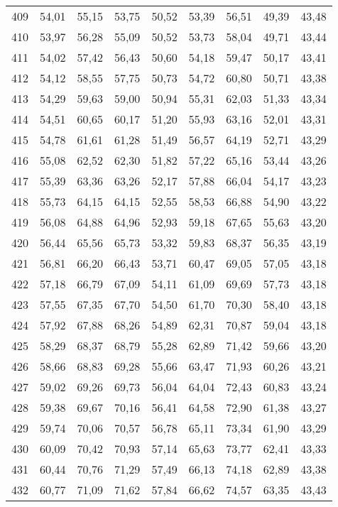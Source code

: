 \begin{longtable}{c c c c c c c c c}
409	& 54,01	& 55,15	& 53,75	& 50,52	& 53,39	& 56,51	& 49,39	& 43,48 \\
410	& 53,97	& 56,28	& 55,09	& 50,52	& 53,73	& 58,04	& 49,71	& 43,44 \\
411	& 54,02	& 57,42	& 56,43	& 50,60	& 54,18	& 59,47	& 50,17	& 43,41 \\
412	& 54,12	& 58,55	& 57,75	& 50,73	& 54,72	& 60,80	& 50,71	& 43,38 \\
413	& 54,29	& 59,63	& 59,00	& 50,94	& 55,31	& 62,03	& 51,33	& 43,34 \\
414	& 54,51	& 60,65	& 60,17	& 51,20	& 55,93	& 63,16	& 52,01	& 43,31 \\
415	& 54,78	& 61,61	& 61,28	& 51,49	& 56,57	& 64,19	& 52,71	& 43,29 \\
416	& 55,08	& 62,52	& 62,30	& 51,82	& 57,22	& 65,16	& 53,44	& 43,26 \\
417	& 55,39	& 63,36	& 63,26	& 52,17	& 57,88	& 66,04	& 54,17	& 43,23 \\
418	& 55,73	& 64,15	& 64,15	& 52,55	& 58,53	& 66,88	& 54,90	& 43,22 \\
419	& 56,08	& 64,88	& 64,96	& 52,93	& 59,18	& 67,65	& 55,63	& 43,20 \\
420	& 56,44	& 65,56	& 65,73	& 53,32	& 59,83	& 68,37	& 56,35	& 43,19 \\
421	& 56,81	& 66,20	& 66,43	& 53,71	& 60,47	& 69,05	& 57,05	& 43,18 \\
422	& 57,18	& 66,79	& 67,09	& 54,11	& 61,09	& 69,69	& 57,73	& 43,18 \\
423	& 57,55	& 67,35	& 67,70	& 54,50	& 61,70	& 70,30	& 58,40	& 43,18 \\
424	& 57,92	& 67,88	& 68,26	& 54,89	& 62,31	& 70,87	& 59,04	& 43,18 \\
425	& 58,29	& 68,37	& 68,79	& 55,28	& 62,89	& 71,42	& 59,66	& 43,20 \\
426	& 58,66	& 68,83	& 69,28	& 55,66	& 63,47	& 71,93	& 60,26	& 43,21 \\
427	& 59,02	& 69,26	& 69,73	& 56,04	& 64,04	& 72,43	& 60,83	& 43,24 \\
428	& 59,38	& 69,67	& 70,16	& 56,41	& 64,58	& 72,90	& 61,38	& 43,27 \\
429	& 59,74	& 70,06	& 70,57	& 56,78	& 65,11	& 73,34	& 61,90	& 43,29 \\
430	& 60,09	& 70,42	& 70,93	& 57,14	& 65,63	& 73,77	& 62,41	& 43,33 \\
431	& 60,44	& 70,76	& 71,29	& 57,49	& 66,13	& 74,18	& 62,89	& 43,38 \\
432	& 60,77	& 71,09	& 71,62	& 57,84	& 66,62	& 74,57	& 63,35	& 43,43 \\

\end{longtable}
